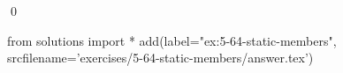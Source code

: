 
\begin{ex}
  \label{ex:5-64-static-members}
  
  \qed
\end{ex}
\begin{python0}
from solutions import *
add(label="ex:5-64-static-members",
    srcfilename='exercises/5-64-static-members/answer.tex')
\end{python0}
